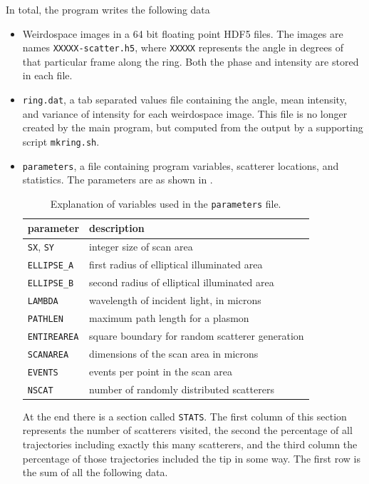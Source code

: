 In total, the program writes the following data
\begin{itemize}
\item Weirdospace images in a 64 bit floating point HDF5 files.  The images
are names {\tt XXXXX-scatter.h5}, where {\tt XXXXX} represents the angle
in degrees of that particular frame along the ring.  Both the phase and
intensity are stored in each file.
\item {\tt ring.dat}, a tab separated values file containing the angle,
mean intensity, and variance of intensity for each weirdospace image.  This
file is no longer created by the main program, but computed from the output
by a supporting script {\tt mkring.sh}.
\item {\tt parameters}, a file containing program variables, scatterer
locations, and statistics.  The parameters are as shown in .
\begin{table}
\begin{center}
\begin{tabular}{ll}
\toprule
parameter & description \\
\midrule
{\tt SX}, {\tt SY} & integer size of scan area\\
{\tt ELLIPSE\_A} & first radius of elliptical illuminated area\\
{\tt ELLIPSE\_B} & second radius of elliptical illuminated area\\
{\tt LAMBDA} & wavelength of incident light, in microns\\
{\tt PATHLEN} & maximum path length for a plasmon\\
{\tt ENTIREAREA} & square boundary for random scatterer generation\\
{\tt SCANAREA} & dimensions of the scan area in microns \\
{\tt EVENTS} & events per point in the scan area\\
{\tt NSCAT} & number of randomly distributed scatterers\\
\bottomrule
\end{tabular}
\end{center}
\caption{Explanation of variables used in the {\tt parameters} file.}
\label{tbl:parameters}
\end{table}
At the end there is a section called {\tt STATS}.  The first column of this
section represents the number of scatterers visited, the second the
percentage of all trajectories including exactly this many scatterers, and
the third column the percentage of those trajectories included the tip in
some way.  The first row is the sum of all the following data.
\end{itemize}

